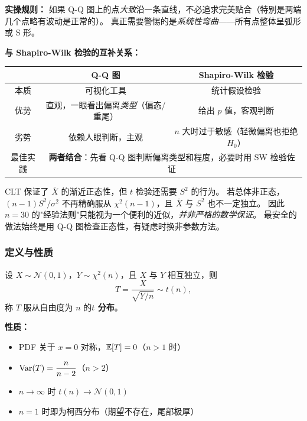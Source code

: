 \textbf{实操规则：} 如果 Q-Q 图上的点\emph{大致}沿一条直线，不必追求完美贴合（特别是两端几个点略有波动是正常的）。
真正需要警惕的是\emph{系统性弯曲}——所有点整体呈弧形或 S 形。

\medskip
\textbf{与 Shapiro-Wilk 检验的互补关系：}

\begin{center}
\renewcommand{\arraystretch}{1.3}
\begin{tabular}{c|c|c}
\toprule
& \textbf{Q-Q 图} & \textbf{Shapiro-Wilk 检验} \\
\midrule
本质 & 可视化工具 & 统计假设检验 \\
优势 & 直观，一眼看出偏离\emph{类型}（偏态/重尾） & 给出 $p$ 值，客观判断 \\
劣势 & 依赖人眼判断，主观 & $n$ 大时过于敏感（轻微偏离也拒绝 $H_0$） \\
最佳实践 & \multicolumn{2}{c}{\textbf{两者结合}：先看 Q-Q 图判断偏离类型和程度，必要时用 SW 检验佐证} \\
\bottomrule
\end{tabular}
\end{center}

\begin{remark}
CLT 保证了 $\bar{X}$ 的渐近正态性，但 $t$ 检验还需要 $S^2$ 的行为。
若总体非正态，$(n-1)S^2/\sigma^2$ 不再精确服从 $\chi^2(n-1)$，且 $\bar{X}$ 与 $S^2$ 也不一定独立。
因此 $n=30$ 的"经验法则"只能视为一个便利的近似，\emph{并非严格的数学保证}。
最安全的做法始终是用 Q-Q 图检查正态性，有疑虑时换非参数方法。
\end{remark}

\subsubsection{定义与性质}

\begin{definition}[$t$ 分布]
设 $X \sim \mathcal{N}(0,1)$，$Y \sim \chi^2(n)$，且 $X$ 与 $Y$ 相互独立，则
\begin{equation}
    T = \frac{X}{\sqrt{Y / n}} \sim t(n),
\end{equation}
称 $T$ 服从自由度为 $n$ 的\textbf{$t$ 分布}。
\end{definition}

\textbf{性质：}
\begin{itemize}
    \item PDF 关于 $x = 0$ 对称，$\mathbb{E}[T] = 0$（$n > 1$ 时）
    \item $\mathrm{Var}(T) = \dfrac{n}{n-2}$（$n > 2$）
    \item $n \to \infty$ 时 $t(n) \to \mathcal{N}(0,1)$
    \item $n = 1$ 时即为柯西分布（期望不存在，尾部极厚）
\end{itemize}

